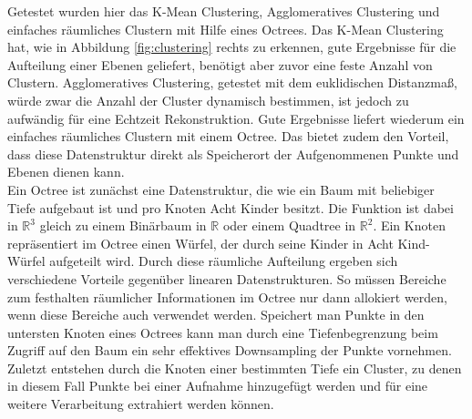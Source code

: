 Getestet wurden hier das K-Mean Clustering, Agglomeratives Clustering und einfaches räumliches Clustern mit Hilfe eines Octrees. Das K-Mean Clustering hat, wie in Abbildung \ref{fig:clustering} rechts zu erkennen, gute Ergebnisse für die Aufteilung einer Ebenen geliefert, benötigt aber zuvor eine feste Anzahl von Clustern. Agglomeratives Clustering, getestet mit dem euklidischen Distanzmaß, würde zwar die Anzahl der Cluster dynamisch bestimmen, ist jedoch zu aufwändig für eine Echtzeit Rekonstruktion. Gute Ergebnisse liefert wiederum ein einfaches räumliches Clustern mit einem Octree. Das bietet zudem den Vorteil, dass diese Datenstruktur direkt als Speicherort der Aufgenommenen Punkte und Ebenen dienen kann. \\

Ein Octree ist zunächst eine Datenstruktur, die wie ein Baum mit beliebiger Tiefe aufgebaut ist und pro Knoten Acht Kinder besitzt. Die Funktion ist dabei in \(\mathbb{R}^3\) gleich zu einem Binärbaum in \(\mathbb{R}\) oder einem Quadtree in \(\mathbb{R}^2\). Ein Knoten repräsentiert im Octree einen Würfel, der durch seine Kinder in Acht Kind-Würfel aufgeteilt wird. Durch diese räumliche Aufteilung ergeben sich verschiedene Vorteile gegenüber linearen Datenstrukturen. So müssen Bereiche zum festhalten räumlicher Informationen im Octree nur dann allokiert werden, wenn diese Bereiche auch verwendet werden. Speichert man Punkte in den untersten Knoten eines Octrees kann man durch eine Tiefenbegrenzung beim Zugriff auf den Baum ein sehr effektives Downsampling der Punkte vornehmen. Zuletzt entstehen durch die Knoten einer bestimmten Tiefe ein Cluster, zu denen in diesem Fall Punkte bei einer Aufnahme hinzugefügt werden und für eine weitere Verarbeitung extrahiert werden können.\\

